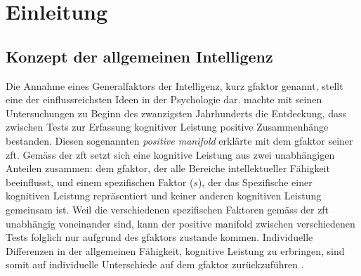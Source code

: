 \documentclass[11pt, twoside, a4paper]{book}		%
\begin{document}
\mainmatter				%
\chapter{Einleitung \label{cha:Einleitung}}

\section{Konzept der allgemeinen Intelligenz}

Die Annahme eines Generalfaktors der Intelligenz, kurz \gls*{gfaktor} genannt, stellt eine der einflussreichsten Ideen in der Psychologie dar. \citet{Spearman1904, Spearman1927} machte mit seinen Untersuchungen zu Beginn des zwanzigsten Jahrhunderts die Entdeckung, dass zwischen Tests zur Erfassung kognitiver Leistung positive Zusammenhänge bestanden. Diesen sogenannten \textit{positive manifold} erklärte \citeauthor{Spearman1927} mit dem \gls*{gfaktor} seiner \gls*{zft}. Gemäss der \gls*{zft} setzt sich eine kognitive Leistung aus zwei unabhängigen Anteilen zusammen: dem \gls{gfaktor}, der alle Bereiche intellektueller Fähigkeit beeinflusst, und einem spezifischen Faktor ($s$), der das Spezifische einer kognitiven Leistung repräsentiert und keiner anderen kognitiven Leistung gemeinsam ist. Weil die verschiedenen spezifischen Faktoren gemäss der \gls{zft} unabhängig voneinander sind, kann der positive manifold zwischen verschiedenen Tests folglich nur aufgrund des \gls{gfaktor}s zustande kommen. Individuelle Differenzen in der allgemeinen Fähigkeit, kognitive Leistung zu erbringen, sind somit auf individuelle Unterschiede auf dem \gls{gfaktor} zurückzuführen \citep{Spearman1904, Spearman1927}.
\end{document}
